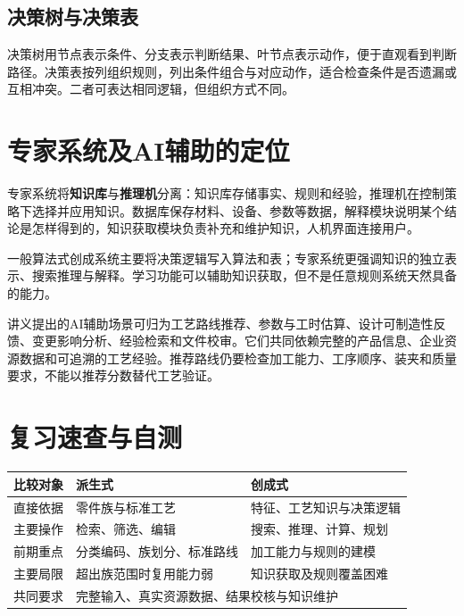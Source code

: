 
\subsection{决策树与决策表}
决策树用节点表示条件、分支表示判断结果、叶节点表示动作，便于直观看到判断路径。决策表按列组织规则，列出条件组合与对应动作，适合检查条件是否遗漏或互相冲突。二者可表达相同逻辑，但组织方式不同。



\section{专家系统及AI辅助的定位}

专家系统将\textbf{知识库}与\textbf{推理机}分离：知识库存储事实、规则和经验，推理机在控制策略下选择并应用知识。数据库保存材料、设备、参数等数据，解释模块说明某个结论是怎样得到的，知识获取模块负责补充和维护知识，人机界面连接用户。

一般算法式创成系统主要将决策逻辑写入算法和表；专家系统更强调知识的独立表示、搜索推理与解释。学习功能可以辅助知识获取，但不是任意规则系统天然具备的能力。

讲义提出的AI辅助场景可归为工艺路线推荐、参数与工时估算、设计可制造性反馈、变更影响分析、经验检索和文件校审。它们共同依赖完整的产品信息、企业资源数据和可追溯的工艺经验。推荐路线仍要检查加工能力、工序顺序、装夹和质量要求，不能以推荐分数替代工艺验证。

\Needspace{13cm}
\section{复习速查与自测}
\begin{center}
\begin{tabularx}{\linewidth}{@{}p{.2\linewidth}XX@{}}
\toprule
比较对象 & 派生式 & 创成式\\
\midrule
直接依据 & 零件族与标准工艺 & 特征、工艺知识与决策逻辑\\
主要操作 & 检索、筛选、编辑 & 搜索、推理、计算、规划\\
前期重点 & 分类编码、族划分、标准路线 & 加工能力与规则的建模\\
主要局限 & 超出族范围时复用能力弱 & 知识获取及规则覆盖困难\\
共同要求 & \multicolumn{2}{l}{完整输入、真实资源数据、结果校核与知识维护}\\
\bottomrule
\end{tabularx}
\end{center}

